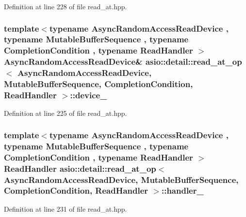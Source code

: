 Definition at line 228 of file read\+\_\+at.\+hpp.

\hypertarget{classasio_1_1detail_1_1read__at__op_a3a786692c55ee5056d74f1ce4ef3e62b}{}
\subsubsection[{device\+\_\+}]{\setlength{\rightskip}{0pt plus 5cm}template$<$typename Async\+Random\+Access\+Read\+Device , typename Mutable\+Buffer\+Sequence , typename Completion\+Condition , typename Read\+Handler $>$ Async\+Random\+Access\+Read\+Device\& {\bf asio\+::detail\+::read\+\_\+at\+\_\+op}$<$ Async\+Random\+Access\+Read\+Device, Mutable\+Buffer\+Sequence, Completion\+Condition, Read\+Handler $>$\+::device\+\_\+}\label{classasio_1_1detail_1_1read__at__op_a3a786692c55ee5056d74f1ce4ef3e62b}


Definition at line 225 of file read\+\_\+at.\+hpp.

\hypertarget{classasio_1_1detail_1_1read__at__op_af4b1e25bcc5c12dd185e6097587a38b4}{}
\subsubsection[{handler\+\_\+}]{\setlength{\rightskip}{0pt plus 5cm}template$<$typename Async\+Random\+Access\+Read\+Device , typename Mutable\+Buffer\+Sequence , typename Completion\+Condition , typename Read\+Handler $>$ Read\+Handler {\bf asio\+::detail\+::read\+\_\+at\+\_\+op}$<$ Async\+Random\+Access\+Read\+Device, Mutable\+Buffer\+Sequence, Completion\+Condition, Read\+Handler $>$\+::handler\+\_\+}\label{classasio_1_1detail_1_1read__at__op_af4b1e25bcc5c12dd185e6097587a38b4}


Definition at line 231 of file read\+\_\+at.\+hpp.

\hypertarget{classasio_1_1detail_1_1read__at__op_aa7b0a3f1f48ffb4563f7616a0ee4d780}{}
